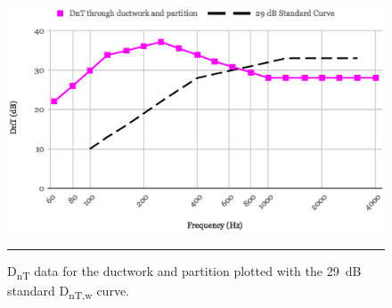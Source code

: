 \begin{figure}[htbp]
	\centering
	\includegraphics[width=\textwidth]{figures/DnTw_D+P.eps}
	\rule{\textwidth}{0.5pt} %
	\caption{D\textsubscript{nT} data for the ductwork and partition plotted with the 29~dB standard D\textsubscript{nT,w} curve.}
	\label{fig:DnTw_both}
\end{figure}